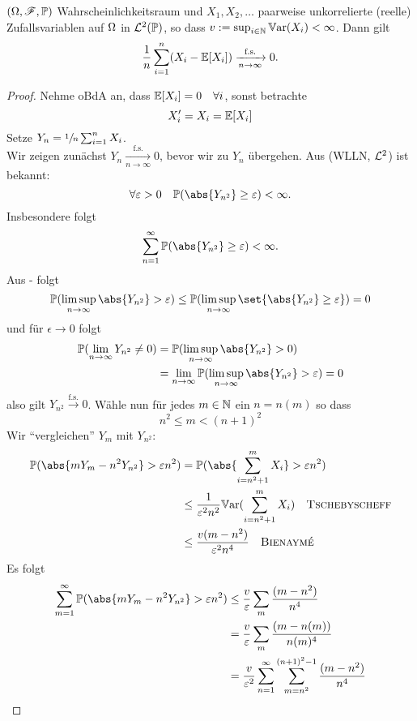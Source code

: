 \begin{proposition}
	$(\Omega, \mathscr F, \mathbb{P})$ Wahrscheinlichkeitsraum und $X_1, X_2, \dots$ paarweise unkorrelierte (reelle) Zufallsvariablen auf $\Omega$ in $\mathcal{L}^{2}(\mathbb{P})$, so dass $v:= \sup_{i \in \mathbb{N}} \mathbb{V}\text{ar}(X_i) < \infty$. Dann gilt
	\begin{align*}
		\frac{1}{n} \sum_{i=1}^n (X_i - \mathbb{E}[X_i]) \xrightarrow[n \to \infty]{\text{f.s.}} 0.
	\end{align*}
\end{proposition}
\begin{proof}
	Nehme oBdA an, dass $\mathbb{E}[X_i] = 0 \quad \forall i$, sonst betrachte
	\[
		X'_i = X_i = \mathbb{E}[X_i]
	\]
	Setze $Y_n = \sfrac{1}{n} \sum_{i=1}^n X_i$.\\
	Wir zeigen zunächst $Y_n \xrightarrow[n \to \infty]{\text{f.s.}} 0$, bevor wir zu $Y_n$ übergehen. Aus  (WLLN, $\mathcal{L}^{2}$) ist bekannt:
	\[
		\forall \epsilon >0 \quad \P(\abs{Y_{n^2}}\ge \epsilon) < \infty.
	\]
	Insbesondere folgt
	\[
		\sum_{n=1}^{\infty} \P(\abs{Y_{n^2}}\ge \epsilon) < \infty.
	\]
	Aus - folgt
	\[
		\P(\limsup_{n \to \infty} \abs{Y_{n^2}} > \epsilon) \le \P(\limsup_{n \to \infty} \set{\abs{Y_{n^2}} \ge \epsilon}) = 0
	\]
	und für $\epsilon \to 0$ folgt
	\begin{align*}
		\P(\lim_{n\to \infty} Y_{n^2} \neq 0) &= \P(\limsup_{n \to \infty} \abs{Y_{n^2}} > 0)\\
		&= \lim_{n\to \infty} \P(\limsup_{n \to \infty} \abs{Y_{n^2}} > \epsilon) = 0
	\end{align*}
	also gilt $Y_{n^2} \xrightarrow{\text{f.s.}} 0$. Wähle nun für jedes $m \in \mathbb{N}$ ein $n = n(m)$ so dass
	\[
		n^2 \le m < (n+1)^2
	\]
	Wir ``vergleichen'' $Y_m$ mit $Y_{n^2}$:
	\begin{align*}
		\P(\abs{m Y_m - n^2 Y_{n^2}} > \epsilon n^2) &= \P(\abs{\sum_{i = n^2+1}^m X_i} > \epsilon n^2)\\
		&\le \frac{1}{\epsilon^2 n^2} \Var(\sum_{i = n^2+1}^m X_i) \quad \text{\person{Tschebyscheff}}\\
		&\le \frac{v(m-n^2)}{\epsilon^2 n^4} \quad \text{\person{Bienaymé}}
	\end{align*}
	Es folgt
	\begin{align*}
		\sum_{m=1}^{\infty} \P(\abs{m Y_m - n^2 Y_{n^2}} > \epsilon n^2) &\le \frac{v}{\epsilon}\sum_m \frac{(m-n^2)}{n^4}\\
		&= \frac{v}{\epsilon} \sum_m \frac{(m-n(m))}{n(m)^4}\\
		&= \frac{v}{\epsilon^2} \sum_{n=1}^{\infty}\sum_{m=n^2}^{(n+1)^2-1} \frac{(m-n^2)}{n^4}\\

\end{align*}
\end{proof}
